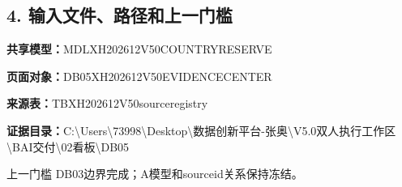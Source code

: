 \documentclass[UTF8,openany,zihao=-4]{ctexbook}
\renewcommand{\_}{\textunderscore\allowbreak}
\begin{document}
\subsection*{4. 输入文件、路径和上一门槛}
\noindent\textbf{共享模型：}{\promptlatin\promptcjk\small MDL\_\allowbreak{}XH202612\_\allowbreak{}V50\_\allowbreak{}COUNTRY\_\allowbreak{}RESERVE}\par
\noindent\textbf{页面对象：}{\promptlatin\promptcjk\small DB05\_\allowbreak{}XH202612\_\allowbreak{}V50\_\allowbreak{}EVIDENCE\_\allowbreak{}CENTER}\par
\noindent\textbf{来源表：}{\promptlatin\promptcjk\small TB\_\allowbreak{}XH202612\_\allowbreak{}V50\_\allowbreak{}source\_\allowbreak{}registry}\par
\noindent\textbf{证据目录：}{\promptlatin\promptcjk\small C:\textbackslash{}\allowbreak{}Users\textbackslash{}\allowbreak{}73998\textbackslash{}\allowbreak{}Desktop\textbackslash{}\allowbreak{}数据创新平台-\allowbreak{}张奥\textbackslash{}\allowbreak{}V5.0\_\allowbreak{}双人执行工作区\textbackslash{}\allowbreak{}B\_\allowbreak{}AI交付\textbackslash{}\allowbreak{}02\_\allowbreak{}看板\textbackslash{}\allowbreak{}DB05}\par
\begin{gatebox}{上一门槛}
DB03边界完成；A模型和source\_id关系保持冻结。

\end{gatebox}
\end{document}
